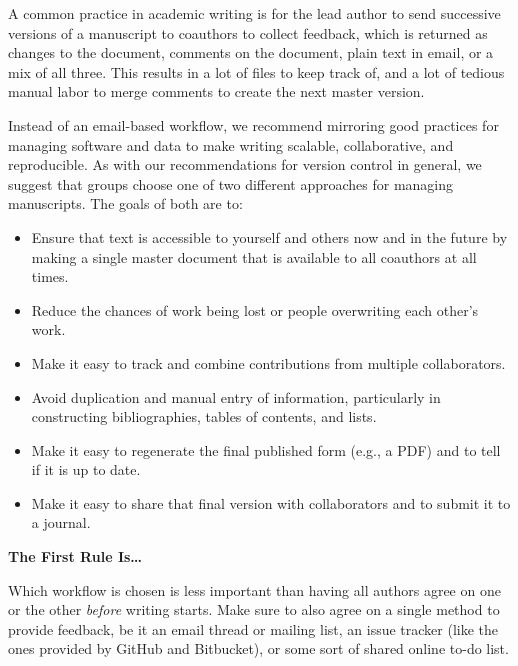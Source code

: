 \documentclass[10pt]{article}
\begin{document}
A common practice in academic writing is for the lead author to send
successive versions of a manuscript to coauthors to collect feedback,
which is returned as changes to the document, comments on the
document, plain text in email, or a mix of all three. This results in
a lot of files to keep track of, and a lot of tedious manual labor to
merge comments to create the next master version.

Instead of an email-based workflow, we recommend mirroring good
practices for managing software and data to make writing scalable,
collaborative, and reproducible.  As with our recommendations for
version control in general, we suggest that groups choose one of two
different approaches for managing manuscripts.  The goals of both are
to:

\begin{itemize}

\item
  Ensure that text is accessible to yourself and others now and in the
  future by making a single master document that is available to all
  coauthors at all times.

\item
  Reduce the chances of work being lost or people overwriting each
  other's work.

\item
  Make it easy to track and combine contributions from multiple
  collaborators.

\item
  Avoid duplication and manual entry of information, particularly in
  constructing bibliographies, tables of contents, and lists.

\item
  Make it easy to regenerate the final published form (e.g., a PDF)
  and to tell if it is up to date.

\item
  Make it easy to share that final version with collaborators and to
  submit it to a journal.

\end{itemize}

\begin{framed}
  \noindent \textbf{The First Rule Is{\ldots}}

  Which workflow is chosen is less important than having all authors
  agree on one or the other \emph{before} writing starts. Make sure to
  also agree on a single method to provide feedback, be it an email
  thread or mailing list, an issue tracker (like the ones provided by
  GitHub and Bitbucket), or some sort of shared online to-do list.
\end{framed}
\end{document}
